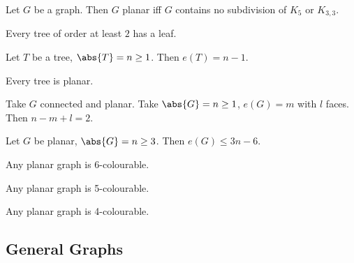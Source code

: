 \documentclass{article}
\begin{document}
\begin{nthm}\label{thm:19}
    Let $G$ be a graph. Then $G$ planar iff $G$ contains no subdivision of $K_5$ or $K_{3,3}$.
\end{nthm}





\begin{nprop}\label{prop:20}
    Every tree of order at least $2$ has a leaf.
\end{nprop}








\begin{nprop}\label{prop:21}
    Let $T$ be a tree, $\abs{T} = n \geq 1$. Then $e(T) = n-1$.
\end{nprop}

\begin{nprop}\label{prop:22}
    Every tree is planar.
\end{nprop}



\begin{nthm}\label{thm:23}
    Take $G$ connected and planar.
    Take $\abs{G} = n \geq 1$, $e(G) = m$ with $l$ faces.
    Then $n - m + l = 2$.
\end{nthm}

\begin{ncor}\label{cor:24}
    Let $G$ be planar, $\abs{G} = n \geq 3$. Then $e(G) \leq 3n-6$.
\end{ncor}

\begin{nprop}\label{prop:25}
    Any planar graph is 6-colourable.
\end{nprop}

\begin{nthm}\label{thm:26}
    Any planar graph is 5-colourable.
\end{nthm}

\begin{nthm}\label{thm:27}
    Any planar graph is 4-colourable.
\end{nthm}



\subsection{General Graphs}
\end{document}
